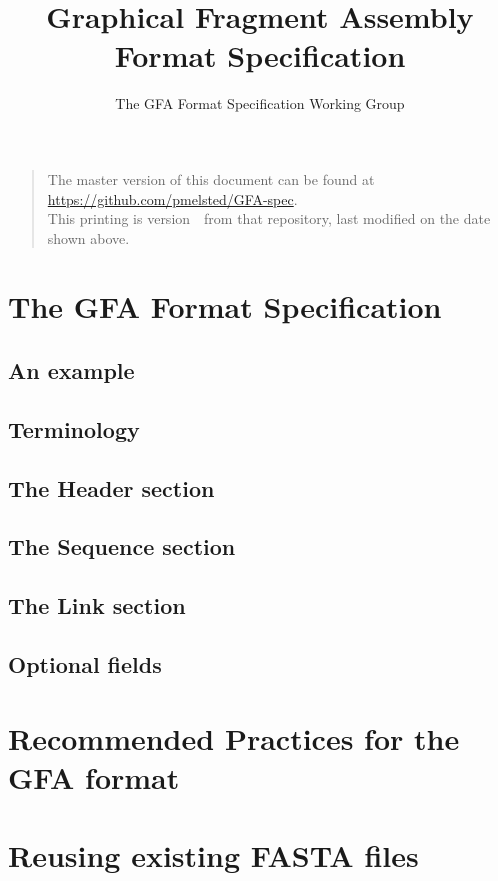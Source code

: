 \documentclass[10pt]{article}
\begin{document}

\title{Graphical Fragment Assembly Format Specification}
\author{The GFA Format Specification Working Group}
\date{\headdate}
\maketitle
\begin{quote}\small
The master version of this document can be found at
\url{https://github.com/pmelsted/GFA-spec}.\\
This printing is version~\commitdesc\ from that repository,
last modified on the date shown above.
\end{quote}
\vspace*{1em}


\section{The GFA Format Specification}

\subsection{An example}

\subsection{Terminology}

\subsection{The Header section}

\subsection{The Sequence section}

\subsection{The Link section}

\subsection{Optional fields}

\section{Recommended Practices for the GFA format}

\section{Reusing existing FASTA files}
\end{document}

